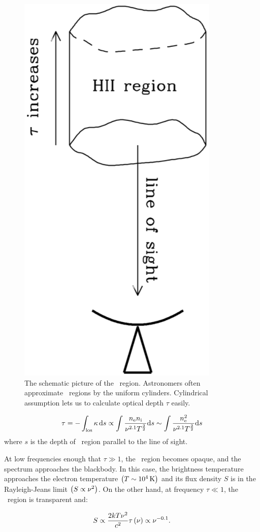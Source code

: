 \begin{figure}[htbp]
	\centering
	\includegraphics[width=.4\linewidth]{Chapter_2/Figures/NRAO_radio4n7.png}
    \caption[The schematic picture of \ih~region]{\label{fig:nrao_radio4n7}
        The schematic picture of the \ih~region.
        Astronomers often approximate \ih~regions by the uniform cylinders.
        Cylindrical assumption lets us to calculate optical depth $\tau$ easily.
    }
\end{figure}

\begin{equation}\label{eq:essential_radio4n53}
    \tau=-\int_{\mathrm{los}} \kappa\,\mathrm{d} s \propto \int \frac{n_{\mathrm{e}} n_{\mathrm{i}}}{\nu^{2.1} T^{\frac{3}{2}}} \mathrm{d} s \sim \int \frac{n_{\mathrm{e}}^2}{\nu^{2.1} T^{\frac{3}{2}}} \mathrm{d} s
\end{equation}
where $s$ is the depth of \ih~region parallel to the line of sight.

At low frequencies enough that $\tau \gg 1$, the \ih~region becomes opaque, and the spectrum approaches the blackbody.
In this case, the brightness temperature approaches the electron temperature $\left(T\sim10^4\,\mathrm{K}\right)$ and its flux density $S$ is in the Rayleigh-Jeans limit $\left(S \propto \nu^2\right)$.
On the other hand, at frequency $\tau \ll 1$, the \ih~region is transparent and:

\begin{equation}\label{eq:freefreeflatspectra}
S \propto \frac{2kT\nu^2}{c^2}\tau\left(\nu\right) \propto \nu^{-0.1}.
\end{equation}

